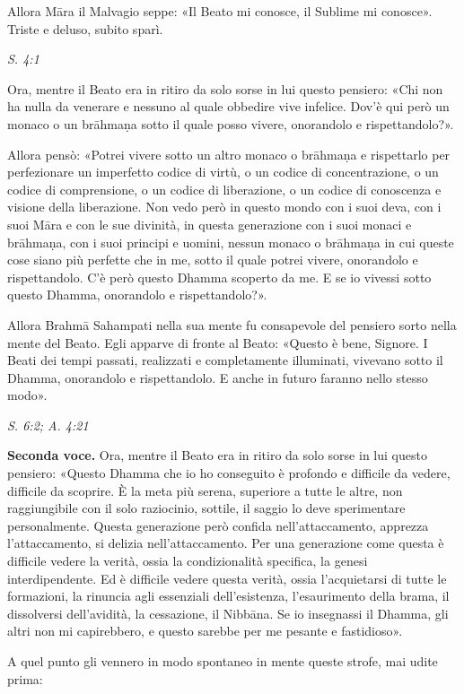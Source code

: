 Allora Māra il Malvagio seppe: «Il Beato mi conosce, il Sublime mi
conosce». Triste e deluso, subito sparì.


\emph{S. 4:1}


Ora, mentre il Beato era in ritiro da solo sorse in lui questo pensiero:
«Chi non ha nulla da venerare e nessuno al quale obbedire vive infelice.
Dov’è qui però un monaco o un brāhmaṇa sotto il quale posso vivere,
onorandolo e rispettandolo?».


Allora pensò: «Potrei vivere sotto un altro monaco o brāhmaṇa e
rispettarlo per perfezionare un imperfetto codice di virtù, o un codice
di concentrazione, o un codice di comprensione, o un codice di
liberazione, o un codice di conoscenza e visione della liberazione. Non
vedo però in questo mondo con i suoi deva, con i suoi Māra e con le sue
divinità, in questa generazione con i suoi monaci e brāhmaṇa, con i suoi
principi e uomini, nessun monaco o brāhmaṇa in cui queste cose siano più
perfette che in me, sotto il quale potrei vivere, onorandolo e
rispettandolo. C’è però questo Dhamma scoperto da me. E se io vivessi
sotto questo Dhamma, onorandolo e rispettandolo?».


Allora Brahmā Sahampati nella sua mente fu consapevole del pensiero
sorto nella mente del Beato. Egli apparve di fronte al Beato: «Questo è
bene, Signore. I Beati dei tempi passati, realizzati e completamente
illuminati, vivevano sotto il Dhamma, onorandolo e rispettandolo. E
anche in futuro faranno nello stesso modo».


\emph{S. 6:2; A. 4:21}


\textbf{Seconda voce.} Ora, mentre il Beato era in ritiro da solo sorse in lui
questo pensiero: «Questo Dhamma che io ho conseguito è profondo e
difficile da vedere, difficile da scoprire. È la meta più serena,
superiore a tutte le altre, non raggiungibile con il solo raziocinio,
sottile, il saggio lo deve sperimentare personalmente. Questa
generazione però confida nell’attaccamento, apprezza l’attaccamento, si
delizia nell’attaccamento. Per una generazione come questa è difficile
vedere la verità, ossia la condizionalità specifica, la genesi
interdipendente. Ed è difficile vedere questa verità, ossia
l’acquietarsi di tutte le formazioni, la rinuncia agli essenziali
dell’esistenza, l’esaurimento della brama, il dissolversi dell’avidità,
la cessazione, il Nibbāna. Se io insegnassi il Dhamma, gli altri non mi
capirebbero, e questo sarebbe per me pesante e fastidioso».


A quel punto gli vennero in modo spontaneo in mente queste strofe, mai
udite prima:


